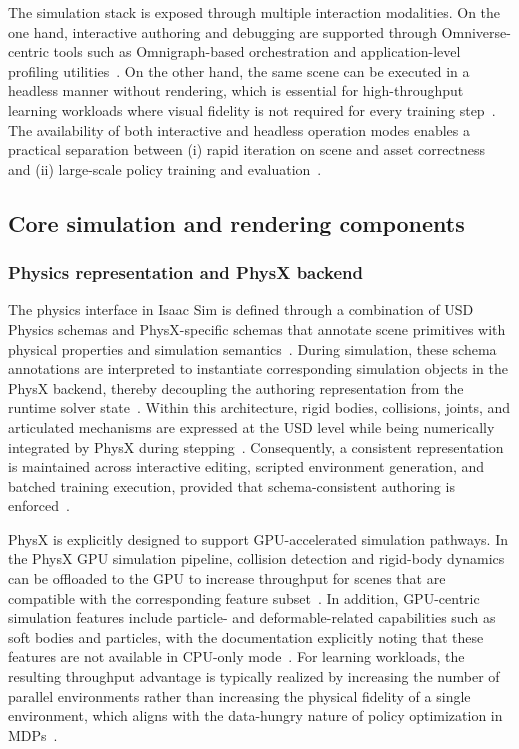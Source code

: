 The simulation stack is exposed through multiple interaction modalities.
On the one hand, interactive authoring and debugging are supported through Omniverse-centric tools such as Omnigraph-based orchestration and application-level profiling utilities~\cite{isaac_sim_510_overview}.
On the other hand, the same scene can be executed in a headless manner without rendering, which is essential for high-throughput learning workloads where visual fidelity is not required for every training step~\cite{isaac_sim_510_physics_fundamentals}.
The availability of both interactive and headless operation modes enables a practical separation between (i) rapid iteration on scene and asset correctness and (ii) large-scale policy training and evaluation~\cite{isaac_sim_510_physics_fundamentals}.

\subsection{Core simulation and rendering components}
\subsubsection{Physics representation and PhysX backend}
The physics interface in Isaac Sim is defined through a combination of \ac{USD} Physics schemas and PhysX-specific schemas that annotate scene primitives with physical properties and simulation semantics~\cite{isaac_sim_510_physics_fundamentals}.
During simulation, these schema annotations are interpreted to instantiate corresponding simulation objects in the PhysX backend, thereby decoupling the authoring representation from the runtime solver state~\cite{isaac_sim_510_physics_fundamentals}.
Within this architecture, rigid bodies, collisions, joints, and articulated mechanisms are expressed at the \ac{USD} level while being numerically integrated by PhysX during stepping~\cite{isaac_sim_510_physics_fundamentals}.
Consequently, a consistent representation is maintained across interactive editing, scripted environment generation, and batched training execution, provided that schema-consistent authoring is enforced~\cite{isaac_sim_510_physics_fundamentals}.

PhysX is explicitly designed to support \ac{GPU}-accelerated simulation pathways.
In the PhysX \ac{GPU} simulation pipeline, collision detection and rigid-body dynamics can be offloaded to the \ac{GPU} to increase throughput for scenes that are compatible with the corresponding feature subset~\cite{physx_541_gpu_rigid_bodies}.
In addition, \ac{GPU}-centric simulation features include particle- and deformable-related capabilities such as soft bodies and particles, with the documentation explicitly noting that these features are not available in CPU-only mode~\cite{physx_541_gpu_rigid_bodies}.
For learning workloads, the resulting throughput advantage is typically realized by increasing the number of parallel environments rather than increasing the physical fidelity of a single environment, which aligns with the data-hungry nature of policy optimization in \acp{MDP}~\cite{Makoviychuk2021IsaacGym}.

